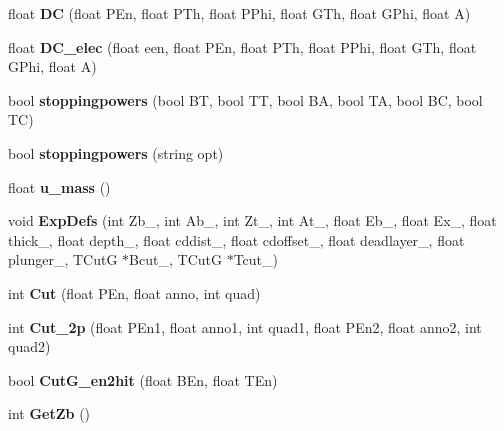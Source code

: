 \begin{DoxyCompactItemize}
float {\bfseries DC} (float P\+En, float P\+Th, float P\+Phi, float G\+Th, float G\+Phi, float A)
\item 
\mbox{\label{classdoppler_ad8387753c2288d464b64579a23d3bc4e}} 
float {\bfseries D\+C\+\_\+elec} (float een, float P\+En, float P\+Th, float P\+Phi, float G\+Th, float G\+Phi, float A)
\item 
\mbox{\label{classdoppler_ad91321c9c9220fff724e5e0982e1a8b8}} 
bool {\bfseries stoppingpowers} (bool BT, bool TT, bool BA, bool TA, bool BC, bool TC)
\item 
\mbox{\label{classdoppler_a4be762591578e28f8e9d646475ca943a}} 
bool {\bfseries stoppingpowers} (string opt)
\item 
\mbox{\label{classdoppler_a68d168fdd3cb3edeb4a015aeaf0d3391}} 
float {\bfseries u\+\_\+mass} ()
\item 
\mbox{\label{classdoppler_ab05f91fbb4af54aef0bf595bd1803be8}} 
void {\bfseries Exp\+Defs} (int Zb\+\_\+, int Ab\+\_\+, int Zt\+\_\+, int At\+\_\+, float Eb\+\_\+, float Ex\+\_\+, float thick\+\_\+, float depth\+\_\+, float cddist\+\_\+, float cdoffset\+\_\+, float deadlayer\+\_\+, float plunger\+\_\+, T\+CutG $\ast$Bcut\+\_\+, T\+CutG $\ast$Tcut\+\_\+)
\item 
\mbox{\label{classdoppler_aa3debb227d73f7cdea5b02e4c202cb19}} 
int {\bfseries Cut} (float P\+En, float anno, int quad)
\item 
\mbox{\label{classdoppler_a52f116733da78465469a75ced66915a8}} 
int {\bfseries Cut\+\_\+2p} (float P\+En1, float anno1, int quad1, float P\+En2, float anno2, int quad2)
\item 
\mbox{\label{classdoppler_a56df9f9384f469385458193754c743c9}} 
bool {\bfseries Cut\+G\+\_\+en2hit} (float B\+En, float T\+En)
\item 
\mbox{\label{classdoppler_a29e9a1565d90df9f5d9deef05cdbf53c}} 
int {\bfseries Get\+Zb} ()
\item 
\mbox{\label{classdoppler_ac3cde63421ff794992231027245ceced}} 

\end{DoxyCompactItemize}
